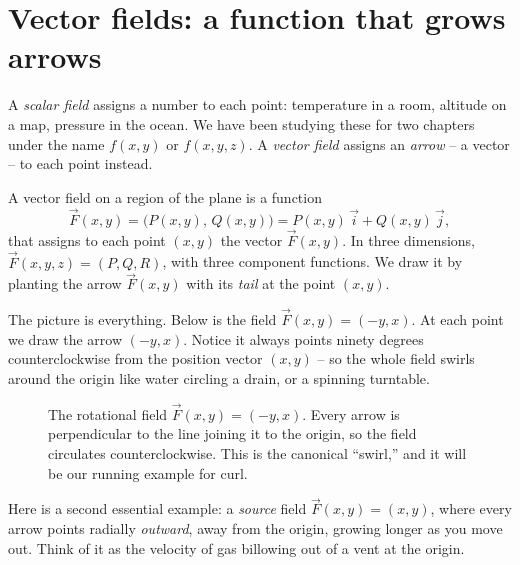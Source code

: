 \chapterline

\section{Vector fields: a function that grows arrows}
\label{ch35:fields}

A \emph{scalar field} assigns a number to each point: temperature in a room,
altitude on a map, pressure in the ocean. We have been studying these for two
chapters under the name $f(x,y)$ or $f(x,y,z)$. A \emph{vector field} assigns an
\emph{arrow} -- a vector -- to each point instead.

\begin{definition}
\label{ch35:def-field}
A vector field on a region of the plane is a function
\[
  \vec F(x,y) = \big(P(x,y),\, Q(x,y)\big) = P(x,y)\,\vec i + Q(x,y)\,\vec j,
\]
that assigns to each point $(x,y)$ the vector $\vec F(x,y)$. In three dimensions,
$\vec F(x,y,z) = (P,Q,R)$, with three component functions. We draw it by planting
the arrow $\vec F(x,y)$ with its \emph{tail} at the point $(x,y)$.
\end{definition}

The picture is everything. Below is the field $\vec F(x,y) = (-y, x)$. At each
point we draw the arrow $(-y,x)$. Notice it always points ninety degrees
counterclockwise from the position vector $(x,y)$ -- so the whole field swirls
around the origin like water circling a drain, or a spinning turntable.

\begin{figure}[H]
\centering
{}
\caption{The rotational field $\vec F(x,y)=(-y,x)$. Every arrow is perpendicular
to the line joining it to the origin, so the field circulates counterclockwise.
This is the canonical ``swirl,'' and it will be our running example for curl.}
\label{ch35:fig-swirl}
\end{figure}

Here is a second essential example: a \emph{source} field
$\vec F(x,y) = (x,y)$, where every arrow points radially \emph{outward}, away
from the origin, growing longer as you move out. Think of it as the velocity of
gas billowing out of a vent at the origin.

